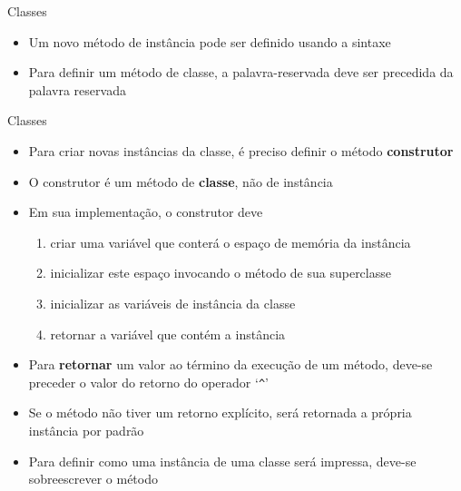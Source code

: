 \begin{frame}[fragile]{Classes}

    \begin{itemize}
        \item Um novo método de instância pode ser definido usando a  sintaxe


        \item Para definir um método de classe, a palavra-reservada  deve
            ser precedida da palavra reservada 

    \end{itemize}

\end{frame}
\begin{frame}[fragile]{Classes}

    \begin{itemize}
        \item Para criar novas instâncias da classe, é preciso definir o método \textbf{construtor}

        \item O construtor é um método de \textbf{classe}, não de instância

        \item Em sua implementação, o construtor deve
        \begin{enumerate}
            \item criar uma variável que conterá o espaço de memória da instância
            \item inicializar este espaço invocando o método  de sua
                superclasse
            \item inicializar as variáveis de instância da classe
            \item retornar a variável que contém a instância
        \end{enumerate}

        \item Para \textbf{retornar} um valor ao término da execução de um método, deve-se
            preceder o valor do retorno do operador `\texttt{\^{}}'

        \item Se o método não tiver um retorno explícito, será retornada a própria instância por
            padrão

        \item Para definir como uma instância de uma classe será impressa, deve-se sobreescrever
            o método 

    \end{itemize}

\end{frame}

